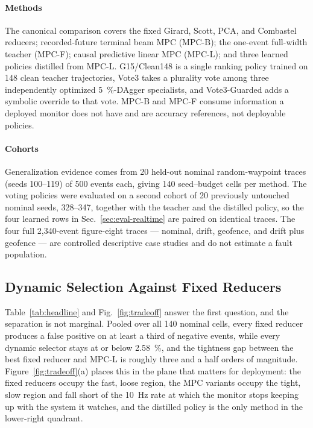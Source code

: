 \documentclass[letterpaper, 10 pt, conference]{ieeeconf}  %
\begin{document}
\paragraph{Methods}
The canonical comparison covers the fixed Girard, Scott, PCA, and Combastel reducers; recorded-future terminal beam MPC (MPC-B); the one-event full-width teacher (MPC-F); causal predictive linear MPC (MPC-L); and three learned policies distilled from MPC-L.
G15/Clean148 is a single ranking policy trained on 148 clean teacher trajectories, Vote3 takes a plurality vote among three independently optimized \SI{5}{\percent}-DAgger specialists, and Vote3-Guarded adds a symbolic override to that vote.
MPC-B and MPC-F consume information a deployed monitor does not have and are accuracy references, not deployable policies.

\paragraph{Cohorts}
Generalization evidence comes from 20 held-out nominal random-waypoint traces (seeds 100--119) of 500 events each, giving 140 seed--budget cells per method.
The voting policies were evaluated on a second cohort of 20 previously untouched nominal seeds, 328--347, together with the teacher and the distilled policy, so the four learned rows in Sec.~\ref{sec:eval-realtime} are paired on identical traces.
The four full 2{,}340-event figure-eight traces --- nominal, drift, geofence, and drift plus geofence --- are controlled descriptive case studies and do not estimate a fault population.

\subsection{Dynamic Selection Against Fixed Reducers}
\label{sec:eval-fixed}
Table~\ref{tab:headline} and Fig.~\ref{fig:tradeoff} answer the first question, and the separation is not marginal.
Pooled over all 140 nominal cells, every fixed reducer produces a false positive on at least a third of negative events, while every dynamic selector stays at or below \SI{2.58}{\percent}, and the tightness gap between the best fixed reducer and MPC-L is roughly three and a half orders of magnitude.
Figure~\ref{fig:tradeoff}(a) places this in the plane that matters for deployment: the fixed reducers occupy the fast, loose region, the MPC variants occupy the tight, slow region and fall short of the \SI{10}{\hertz} rate at which the monitor stops keeping up with the system it watches, and the distilled policy is the only method in the lower-right quadrant.
\end{document}
